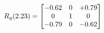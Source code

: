 \documentclass[preview]{standalone}
\begin{document}
\begin{align*}
\special{dvisvgm:raw <g id='unique000'>}R_{y}(2.23) = \begin{bmatrix}-0.62 & 0 & +0.79 \\0 & 1 & 0 \\-0.79 & 0 & -0.62\end{bmatrix}\special{dvisvgm:raw </g>}
\end{align*}
\end{document}
